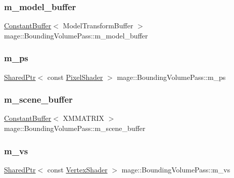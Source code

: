 \subsubsection{\texorpdfstring{m\+\_\+model\+\_\+buffer}{m\_model\_buffer}}
{\footnotesize\ttfamily \hyperlink{structmage_1_1_constant_buffer}{Constant\+Buffer}$<$ Model\+Transform\+Buffer $>$ mage\+::\+Bounding\+Volume\+Pass\+::m\+\_\+model\+\_\+buffer\hspace{0.3cm}{\ttfamily [private]}}

\hypertarget{classmage_1_1_bounding_volume_pass_ab0000ab42165d94025a6725cc93aa9be}{}\label{classmage_1_1_bounding_volume_pass_ab0000ab42165d94025a6725cc93aa9be} 
\subsubsection{\texorpdfstring{m\+\_\+ps}{m\_ps}}
{\footnotesize\ttfamily \hyperlink{namespacemage_a1e01ae66713838a7a67d30e44c67703e}{Shared\+Ptr}$<$ const \hyperlink{namespacemage_ac98506b7edd999ea43ec46fbd0330238}{Pixel\+Shader} $>$ mage\+::\+Bounding\+Volume\+Pass\+::m\+\_\+ps\hspace{0.3cm}{\ttfamily [private]}}

\hypertarget{classmage_1_1_bounding_volume_pass_a349e8ef04cf8204023952639f4be21d1}{}\label{classmage_1_1_bounding_volume_pass_a349e8ef04cf8204023952639f4be21d1} 
\subsubsection{\texorpdfstring{m\+\_\+scene\+\_\+buffer}{m\_scene\_buffer}}
{\footnotesize\ttfamily \hyperlink{structmage_1_1_constant_buffer}{Constant\+Buffer}$<$ X\+M\+M\+A\+T\+R\+IX $>$ mage\+::\+Bounding\+Volume\+Pass\+::m\+\_\+scene\+\_\+buffer\hspace{0.3cm}{\ttfamily [private]}}

\hypertarget{classmage_1_1_bounding_volume_pass_a3d447a3eec97d5ae740c3ad0fdf49f0f}{}\label{classmage_1_1_bounding_volume_pass_a3d447a3eec97d5ae740c3ad0fdf49f0f} 
\subsubsection{\texorpdfstring{m\+\_\+vs}{m\_vs}}
{\footnotesize\ttfamily \hyperlink{namespacemage_a1e01ae66713838a7a67d30e44c67703e}{Shared\+Ptr}$<$ const \hyperlink{classmage_1_1_vertex_shader}{Vertex\+Shader} $>$ mage\+::\+Bounding\+Volume\+Pass\+::m\+\_\+vs\hspace{0.3cm}{\ttfamily [private]}}

